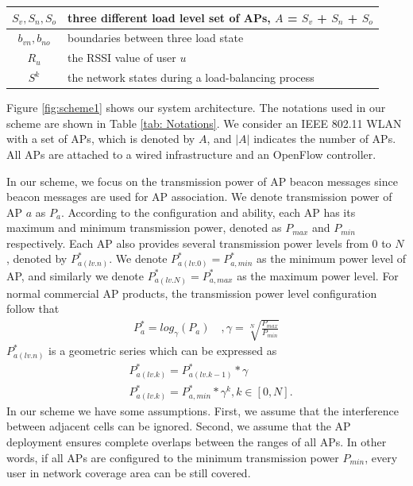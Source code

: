 \begin{table}[tbp]
\begin{center}
\begin{tabularx}{\linewidth}{| c | X | }
            \hline $S_v, S_n, S_o$  & three different load level set of APs, $A$ = $S_v$ + $S_n$ + $S_o$ \\ 
            \hline $b_{vn}, b_{no}$ & boundaries between three load state \\ 
            \hline $R_u$            & the RSSI value of user $u$ \\
            \hline $S^k$            & the network states during a load-balancing process\\
            \hline 
        \end{tabularx} 
    \end{center} 
\end{table}

Figure \ref{fig:scheme1} shows our system architecture. 
The notations used in our scheme are shown in Table \ref{tab: Notations}. 
We consider an IEEE 802.11 WLAN with a set of APs, which is denoted by $A$, and $|A|$ indicates the number of APs. 
All APs are attached to a wired infrastructure and an OpenFlow controller. 

In our scheme, we focus on the transmission power of AP beacon messages since beacon messages are used for AP association.
We denote transmission power of AP $a$ as $P_a$.
According to the configuration and ability, each AP has its maximum and minimum transmission power, denoted as $P_{max}$ and $P_{min}$ respectively. 
Each AP also provides several transmission power levels from $0$ to $N$, denoted by $P_{a(lv.n)}^*$. 
We denote $P_{a(lv.0)}^*=P_{a, min}^*$ as the minimum power level of AP, and similarly we denote $P_{a(lv.N)}^*=P_{a, max}^*$ as the maximum power level.
For normal commercial AP products, the transmission power level configuration follow that
\begin{eqnarray}
{P_a^*}=log _\gamma\left({P_a} \right)  \quad,\gamma=\sqrt[N]{\frac{P_{max}}{P_{min}}}
\end{eqnarray}
$P_{a(lv.n)}^*$ is a geometric series which can be expressed as
\begin{align}
&P_{a(lv.k)}^*={P_{a(lv.k-1)}^*}*\gamma\\										
&P_{a(lv.k)}^*={P_{a, min}^*}*{\gamma^k}, k\in[0, N].							
\end{align}
In our scheme we have some assumptions. First, we assume that the interference between adjacent cells can be ignored. Second, we assume that the AP deployment ensures complete overlaps between the ranges of all APs. In other words, if all APs are configured to the minimum transmission power $P_{min}$, every user in network coverage area can be still covered.

